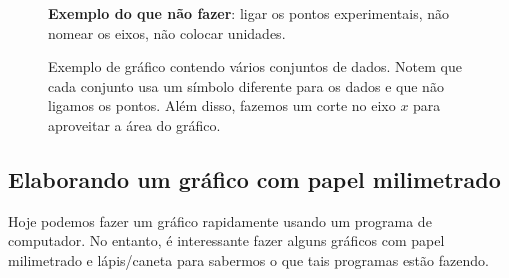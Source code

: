 \begin{figure*}
\centering
\forcerectofloat

\caption{\textbf{Exemplo do que não fazer}: ligar os pontos experimentais, não nomear os eixos, não colocar unidades.}
\label{GraficoErrado}
\end{figure*}

\begin{figure*}
\centering
\forcerectofloat
\label{ExemploGrafico}

\caption{Exemplo de gráfico contendo vários conjuntos de dados. Notem que cada conjunto usa um símbolo diferente para os dados e que não ligamos os pontos. Além disso, fazemos um corte no eixo $x$ para aproveitar a área do gráfico.}
\end{figure*}

\subsection{Elaborando um gráfico com papel milimetrado}

Hoje podemos fazer um gráfico rapidamente usando um programa de computador. No entanto, é interessante fazer alguns gráficos com papel milimetrado e lápis/caneta para sabermos o que tais programas estão fazendo.

